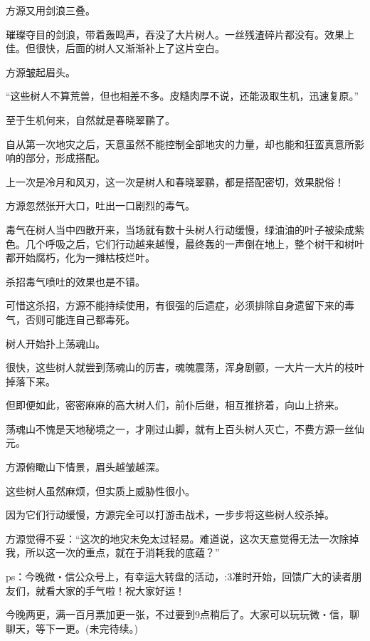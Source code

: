 \begin{this_body}
方源又用剑浪三叠。

璀璨夺目的剑浪，带着轰鸣声，吞没了大片树人。一丝残渣碎片都没有。效果上佳。但很快，后面的树人又渐渐补上了这片空白。

方源皱起眉头。

“这些树人不算荒兽，但也相差不多。皮糙肉厚不说，还能汲取生机，迅速复原。”

至于生机何来，自然就是春晓翠鹂了。

自从第一次地灾之后，天意虽然不能控制全部地灾的力量，却也能和狂蛮真意所影响的部分，形成搭配。

上一次是冷月和风刃，这一次是树人和春晓翠鹂，都是搭配密切，效果脱俗！

方源忽然张开大口，吐出一口剧烈的毒气。

毒气在树人当中四散开来，当场就有数十头树人行动缓慢，绿油油的叶子被染成紫色。几个呼吸之后，它们行动越来越慢，最终轰的一声倒在地上，整个树干和树叶都开始腐朽，化为一摊枯枝烂叶。

杀招毒气喷吐的效果也是不错。

可惜这杀招，方源不能持续使用，有很强的后遗症，必须排除自身遗留下来的毒气，否则可能连自己都毒死。

树人开始扑上荡魂山。

很快，这些树人就尝到荡魂山的厉害，魂魄震荡，浑身剧颤，一大片一大片的枝叶掉落下来。

但即便如此，密密麻麻的高大树人们，前仆后继，相互推挤着，向山上挤来。

荡魂山不愧是天地秘境之一，才刚过山脚，就有上百头树人灭亡，不费方源一丝仙元。

方源俯瞰山下情景，眉头越皱越深。

这些树人虽然麻烦，但实质上威胁性很小。

因为它们行动缓慢，方源完全可以打游击战术，一步步将这些树人绞杀掉。

方源觉得不妥：“这次的地灾未免太过轻易。难道说，这次天意觉得无法一次除掉我，所以这一次的重点，就在于消耗我的底蕴？”

ps：今晚微・信公众号上，有幸运大转盘的活动，:3准时开始，回馈广大的读者朋友们，就看大家的手气啦！祝大家好运！

今晚两更，满一百月票加更一张，不过要到9点稍后了。大家可以玩玩微・信，聊聊天，等下一更。(未完待续。)

\end{this_body}

